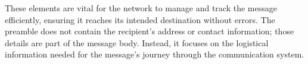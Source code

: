 These elements are vital for the network to manage and track the message efficiently, ensuring it reaches its intended destination without errors. The preamble does not contain the recipient's address or contact information; those details are part of the message body. Instead, it focuses on the logistical information needed for the message's journey through the communication system.

